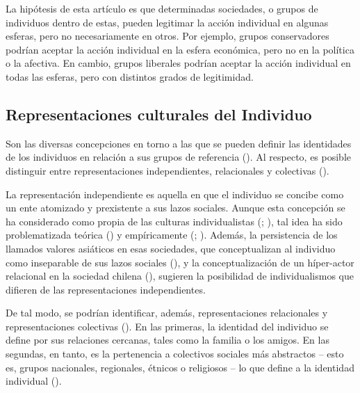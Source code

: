 \documentclass[
  letterpaper,
  DIV=11,
  numbers=noendperiod]{scrartcl}
\begin{document}
La hipótesis de esta artículo es que determinadas sociedades, o grupos
de individuos dentro de estas, pueden legitimar la acción individual en
algunas esferas, pero no necesariamente en otros. Por ejemplo, grupos
conservadores podrían aceptar la acción individual en la esfera
económica, pero no en la política o la afectiva. En cambio, grupos
liberales podrían aceptar la acción individual en todas las esferas,
pero con distintos grados de legitimidad.

\subsection{Representaciones culturales del
Individuo}\label{representaciones-culturales-del-individuo}

Son las diversas concepciones en torno a las que se pueden definir las
identidades de los individuos en relación a sus grupos de referencia
(). Al respecto, es posible
distinguir entre representaciones independientes, relacionales y
colectivas ().

La representación independiente es aquella en que el individuo se
concibe como un ente atomizado y prexistente a sus lazos sociales.
Aunque esta concepción se ha considerado como propia de las culturas
individualistas (;
), tal idea
ha sido problematizada teórica () y empíricamente (; ).
Además, la persistencia de los llamados valores asiáticos en esas
sociedades, que conceptualizan al individuo como inseparable de sus
lazos sociales (), y la
conceptualización de un híper-actor relacional en la sociedad chilena
(), sugieren la
posibilidad de individualismos que difieren de las representaciones
independientes.

De tal modo, se podrían identificar, además, representaciones
relacionales y representaciones colectivas
(). En las primeras, la
identidad del individuo se define por sus relaciones cercanas, tales
como la familia o los amigos. En las segundas, en tanto, es la
pertenencia a colectivos sociales más abstractos -- esto es, grupos
nacionales, regionales, étnicos o religiosos -- lo que define a la
identidad individual ().
\end{document}
